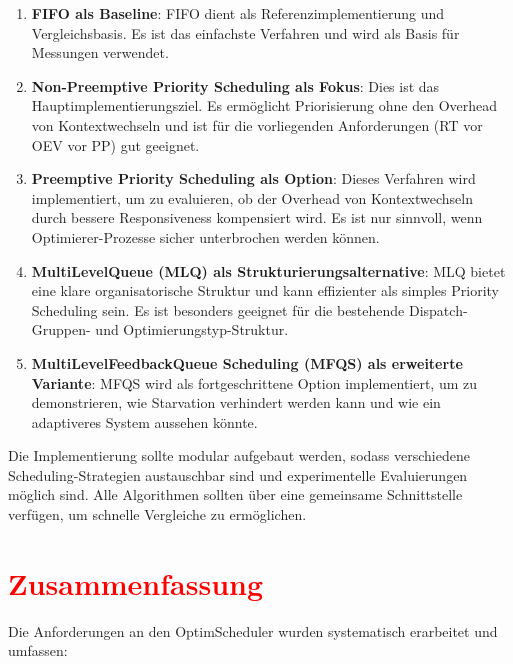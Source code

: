 \begin{enumerate}
    \item \textbf{FIFO als Baseline}: FIFO dient als Referenzimplementierung und Vergleichsbasis. Es ist das einfachste Verfahren und wird als Basis für Messungen verwendet.
    
    \item \textbf{Non-Preemptive Priority Scheduling als Fokus}: Dies ist das Hauptimplementierungsziel. Es ermöglicht Priorisierung ohne den Overhead von Kontextwechseln und ist für die vorliegenden Anforderungen (RT vor OEV vor PP) gut geeignet.
    
    \item \textbf{Preemptive Priority Scheduling als Option}: Dieses Verfahren wird implementiert, um zu evaluieren, ob der Overhead von Kontextwechseln durch bessere Responsiveness kompensiert wird. Es ist nur sinnvoll, wenn Optimierer-Prozesse sicher unterbrochen werden können.
    
    \item \textbf{MultiLevelQueue (MLQ) als Strukturierungsalternative}: MLQ bietet eine klare organisatorische Struktur und kann effizienter als simples Priority Scheduling sein. Es ist besonders geeignet für die bestehende Dispatch-Gruppen- und Optimierungstyp-Struktur.
    
    \item \textbf{MultiLevelFeedbackQueue Scheduling (MFQS) als erweiterte Variante}: MFQS wird als fortgeschrittene Option implementiert, um zu demonstrieren, wie Starvation verhindert werden kann und wie ein adaptiveres System aussehen könnte.
\end{enumerate}

Die Implementierung sollte modular aufgebaut werden, sodass verschiedene Scheduling-Strategien austauschbar sind und experimentelle Evaluierungen möglich sind. Alle Algorithmen sollten über eine gemeinsame Schnittstelle verfügen, um schnelle Vergleiche zu ermöglichen.

\section{\textcolor{red}{Zusammenfassung}}

Die Anforderungen an den OptimScheduler wurden systematisch erarbeitet und umfassen:

